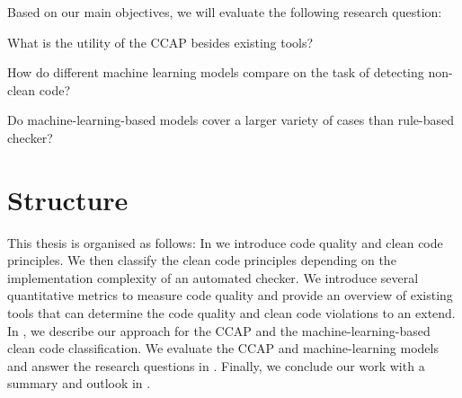 Based on our main objectives, we will evaluate the following research question:
\begin{description}
    \setlength{\itemsep}{1pt}
    \item[RQ1]What is the utility of the CCAP besides existing tools? 
    \item[RQ2]How do different machine learning models compare on the task of detecting non-clean code?
    \item[RQ3]Do machine-learning-based models cover a larger variety of cases than rule-based checker? 
\end{description}


\section{Structure}
This thesis is organised as follows: In  we introduce code quality and clean code principles. We then classify the clean code principles depending on the implementation complexity of an automated checker. We introduce several quantitative metrics to measure code quality and provide an overview of existing tools that can determine the code quality and clean code violations to an extend. 
In , we describe our approach for the CCAP and the machine-learning-based clean code classification. We evaluate the CCAP and machine-learning models and answer the research questions in . Finally, we conclude our work with a summary and outlook in .